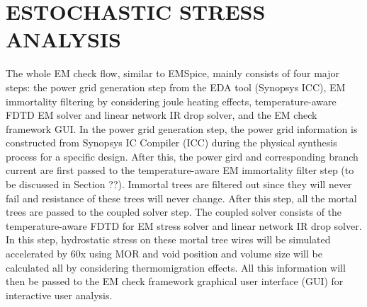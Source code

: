 \section{ESTOCHASTIC STRESS ANALYSIS}
  \label{sec:stochastic}
The whole EM check flow, similar to EMSpice, mainly consists of four major
steps: the power grid generation step from the EDA tool
(Synopsys ICC), EM immortality filtering by considering joule heating effects, temperature-aware
FDTD EM solver and linear network IR drop solver, and the EM check
framework GUI. In the power grid generation step, the power
grid information is constructed from Synopsys IC Compiler
(ICC) during the physical synthesis process for a specific
design. After this, the power gird and corresponding
branch current are first passed to the temperature-aware EM immortality
filter step (to be discussed in Section ??). Immortal trees are
filtered out since they will never fail and resistance of these
trees will never change. After this step, all the mortal trees
are passed to the coupled solver step. The coupled solver consists
of the temperature-aware FDTD for EM stress solver and linear network
IR drop solver. In this step, hydrostatic stress on these mortal tree wires will
be simulated accelerated by 60x using MOR and void position and volume size will be calculated all by considering thermomigration effects.
All this information will then be passed to the EM check
framework graphical user interface (GUI) for interactive user
analysis.
